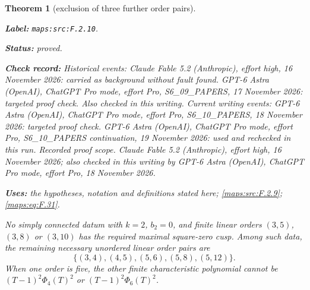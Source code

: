 \documentclass[11pt,a4paper]{article}
\newtheorem{theorem}{Theorem}[section]
\theoremstyle{definition}
\newcommand{\StatementRecord}[4]{\par\smallskip\begingroup\upshape\raggedright\noindent\textbf{Label:} \nolinkurl{#1}.\par\noindent\textbf{Status:} #2.\par\noindent\textbf{Check record:} #3.\par\noindent\textbf{Uses:} #4.\par\endgroup\smallskip}
\begin{document}
\begin{theorem}[exclusion of three further order pairs]\label{maps:src:F.2.10}
\StatementRecord{maps:src:F.2.10}{proved}{Historical events: Claude Fable 5.2 (Anthropic), effort high, 16 November 2026: carried as background without fault found. GPT-6 Astra (OpenAI), ChatGPT Pro mode, effort Pro, S6\_09\_PAPERS, 17 November 2026: targeted proof check. Also checked in this writing. Current writing events: GPT-6 Astra (OpenAI), ChatGPT Pro mode, effort Pro, S6\_10\_PAPERS, 18 November 2026: targeted proof check. GPT-6 Astra (OpenAI), ChatGPT Pro mode, effort Pro, S6\_10\_PAPERS continuation, 19 November 2026: used and rechecked in this run. \emph{Recorded proof scope.} Claude Fable 5.2 (Anthropic), effort high, 16 November 2026; also checked in this writing by GPT-6 Astra (OpenAI), ChatGPT Pro mode, effort Pro, 18 November 2026}{the hypotheses, notation and definitions stated here; \cref{maps:src:F.2.9}; \cref{maps:eq:F.31}}


No simply connected datum with $k=2$, $b_2=0$, and finite linear orders
$(3,5)$, $(3,8)$ or $(3,10)$ has the required maximal
square-zero cusp.  Among such data, the
remaining necessary unordered linear order pairs are
\[
 \{(3,4),(4,5),(5,6),(5,8),(5,12)\}.
 \tag{F.30}\label{maps:eq:F.30}
\]
When one order is five, the other finite characteristic
polynomial cannot be $(T-1)^2\Phi_4(T)^2$ or
$(T-1)^2\Phi_6(T)^2$.

\end{theorem}
\end{document}
